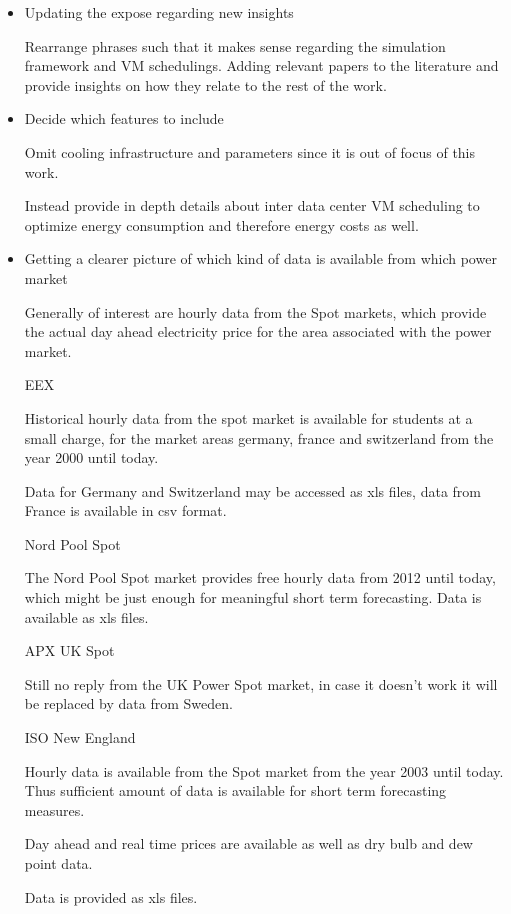 \documentclass[a4paper]{article}
\begin{document}
\begin{itemize}

\item Updating the expose regarding new insights

Rearrange phrases such that it makes sense regarding the simulation framework 
and VM schedulings. Adding relevant papers to the literature and provide insights on 
how they relate to the rest of the work. 

\item Decide which features to include

Omit cooling infrastructure and parameters since it is out of focus of this work. 

Instead provide in depth details about inter data center VM scheduling to optimize
energy consumption and therefore energy costs as well. 

\item Getting a clearer picture of which kind of data is available from which power market

Generally of interest are hourly data from the Spot markets, which provide the actual day ahead 
electricity price for the area associated with the power market. 

\subitem EEX

Historical hourly data from the spot market is available for students at a small charge, for 
the market areas germany, france and switzerland from the year 2000 until today. 

Data for Germany and Switzerland may be accessed as xls files, data from France is available in csv format. 

\subitem Nord Pool Spot

The Nord Pool Spot market provides free hourly data from 2012 until today, which might be just enough for 
meaningful short term forecasting. Data is available as xls files. 

\subitem APX UK Spot

Still no reply from the UK Power Spot market, in case it doesn't work it will be replaced by data from Sweden. 

\subitem ISO New England

Hourly data is available from the Spot market from the year 2003 until today. Thus sufficient amount of data
is available for short term forecasting measures. 

Day ahead and real time prices are available as well as dry bulb and dew point data. 

Data is provided as xls files. 


\end{itemize}
\end{document}
